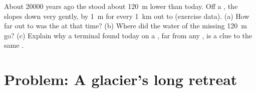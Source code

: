 \begin{exercise}[$\star\star\star$]\label{exo:g8:ice-on-earth:12}
About \num{20000} years ago the  stood about \qty{120}{m} lower than
today. Off a , the  slopes down very gently, by
\qty{1}{m} for every \qty{1}{km} out to  (exercise data). (a) How far
out to  was the  at that time? (b) Where did the water of the
missing \qty{120}{m} go? (c) Explain why a terminal  found today on
a , far from any , is a clue to the same .
\end{exercise}

\section{Problem: A glacier's long retreat}

